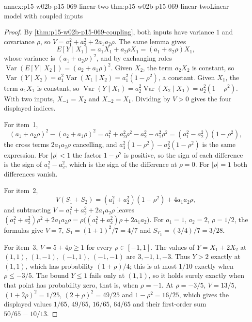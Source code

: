 \begin{annexitem}{annex:p15-w02b-p15-069-linear-two}
 {thm:p15-w02b-p15-069-linear-two}{Linear model with coupled inputs}
\begin{proof}
By \cref{thm:p15-w02b-p15-069-coupling}, both inputs have variance \(1\)
and covariance \(\rho\), so
\(V=a_1^2+a_2^2+2a_1a_2\rho\). The same lemma gives
\[
 E[Y\mid X_1]=a_1X_1+a_2\rho X_1=(a_1+a_2\rho)X_1,
\]
whose variance is \((a_1+a_2\rho)^2\), and by exchanging roles
\(\operatorname{Var}(E[Y\mid X_2])=(a_2+a_1\rho)^2\). Given \(X_2\), the
term \(a_2X_2\) is constant, so
\(\operatorname{Var}(Y\mid X_2)=a_1^2\operatorname{Var}(X_1\mid X_2)
 =a_1^2(1-\rho^2)\), a constant. Given \(X_1\), the term \(a_1X_1\) is
constant, so
\(\operatorname{Var}(Y\mid X_1)=a_2^2\operatorname{Var}(X_2\mid X_1)
 =a_2^2(1-\rho^2)\). With two inputs,
\(X_{-1}=X_2\) and \(X_{-2}=X_1\). Dividing by \(V>0\) gives the four
displayed indices.

For item~1,
\[
 (a_1+a_2\rho)^2-(a_2+a_1\rho)^2
 =a_1^2+a_2^2\rho^2-a_2^2-a_1^2\rho^2
 =(a_1^2-a_2^2)(1-\rho^2),
\]
the cross terms \(2a_1a_2\rho\) cancelling, and
\(a_1^2(1-\rho^2)-a_2^2(1-\rho^2)\) is the same expression. For
\(|\rho|<1\) the factor \(1-\rho^2\) is positive, so the sign of each
difference is the sign of \(a_1^2-a_2^2\), which is the sign of the
difference at \(\rho=0\). For \(|\rho|=1\) both differences vanish.

For item~2,
\[
 V(S_1+S_2)=(a_1^2+a_2^2)(1+\rho^2)+4a_1a_2\rho,
\]
and subtracting \(V=a_1^2+a_2^2+2a_1a_2\rho\) leaves
\((a_1^2+a_2^2)\rho^2+2a_1a_2\rho
 =\rho\bigl((a_1^2+a_2^2)\rho+2a_1a_2\bigr)\).
For \(a_1=1\), \(a_2=2\), \(\rho=1/2\), the formulas give \(V=7\),
\(S_1=(1+1)^2/7=4/7\) and \(S_{T_1}=(3/4)/7=3/28\).

For item~3, \(V=5+4\rho\geq1\) for every \(\rho\in[-1,1]\). The values of
\(Y=X_1+2X_2\) at \((1,1)\), \((1,-1)\), \((-1,1)\), \((-1,-1)\) are
\(3,-1,1,-3\). Thus \(Y>2\) exactly at \((1,1)\), which has probability
\((1+\rho)/4\); this is at most \(1/10\) exactly when \(\rho\leq-3/5\).
The bound \(Y\leq1\) fails only at \((1,1)\), so it holds surely exactly
when that point has probability zero, that is, when \(\rho=-1\).
At \(\rho=-3/5\), \(V=13/5\), \((1+2\rho)^2=1/25\), \((2+\rho)^2=49/25\)
and \(1-\rho^2=16/25\), which gives the displayed values
\(1/65\), \(49/65\), \(16/65\), \(64/65\) and their first-order sum
\(50/65=10/13\).
\end{proof}
\end{annexitem}

